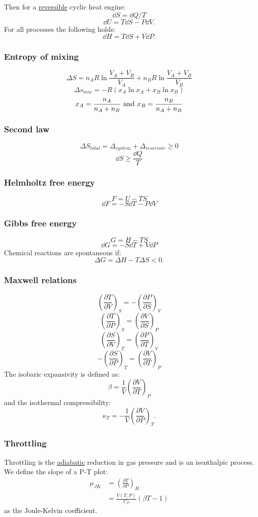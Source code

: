 \documentclass{article}
\begin{document}
\begin{multicols*}{3}
Then for a \underline{reversible} cyclic heat engine:
$$\dd S=\dd Q/T$$
$$\dd U=T\dd S-P\dd V.$$
For all processes the following holds:
$$\dd H=T\dd S+V\dd P.$$

\subsubsection*{Entropy of mixing}
$$\Delta S=n_A R\ln\frac{V_A+V_B}{V_A}
+n_B R\ln\frac{V_A+V_B}{V_B}$$
$$\Delta s_{mix}=-R(x_A\ln x_A+x_B\ln x_B)$$
$$x_A=\frac{n_A}{n_A+n_B}
\hspace{0.05in}\text{and}\hspace{0.05in}
x_B=\frac{n_B}{n_A+n_B}$$

\subsubsection*{Second law}
$$\Delta S_{total}=\Delta_{system}
+\Delta_{reservoir}\geq0$$
$$\dd S\geq\frac{\dd Q}{T}$$

\subsubsection*{Helmholtz free energy}
$$F=U-TS$$
$$\dd F=-S\dd T-P\dd V$$

\subsubsection*{Gibbs free energy}
$$G=H-TS$$
$$\dd G=-S\dd T+V\dd P$$
Chemical reactions are spontaneous if:
$$\Delta G=\Delta H-T\Delta S<0.$$

\subsubsection*{Maxwell relations}
$$\left(\frac{\partial T}{\partial V}\right)_S
=-\left(\frac{\partial P}{\partial S}\right)_V$$
$$\left(\frac{\partial T}{\partial P}\right)_S
=\left(\frac{\partial V}{\partial S}\right)_P$$
$$\left(\frac{\partial S}{\partial V}\right)_T
=\left(\frac{\partial P}{\partial T}\right)_V$$
$$-\left(\frac{\partial S}{\partial P}\right)_T
=\left(\frac{\partial V}{\partial T}\right)_P$$
The isobaric expansivity is defined as:
$$\beta=\frac{1}{V}
\left(\frac{\partial V}{\partial T}\right)_P$$
and the isothermal compressibility:
$$\kappa_T=-\frac{1}{V}
\left(\frac{\partial V}{\partial P}\right)_T.$$

\subsubsection*{Throttling}
Throttling is the \underline{adiabatic} 
reduction in gas pressure
and is an isenthalpic process.
We define
the slope of a P-T plot:
\begin{align*}
    \mu_{JK}&=\left(
    \frac{\partial T}{\partial P}\right)_H \\
    &=\frac{V(T,P)}{C_P}(\beta T-1)
\end{align*}
as the
Joule-Kelvin coefficient.


\end{multicols*}
\end{document}
